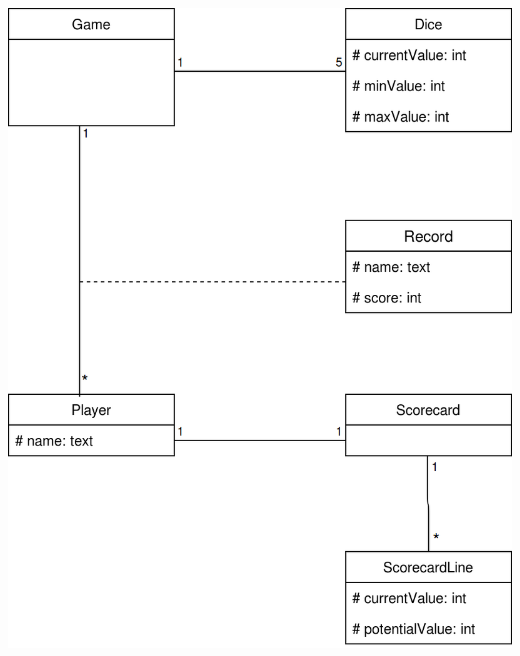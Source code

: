 \documentclass[12pt]{article}
\begin{document}
\includegraphics[scale=.3]{diagrams/domainModel.png}
\end{document}
